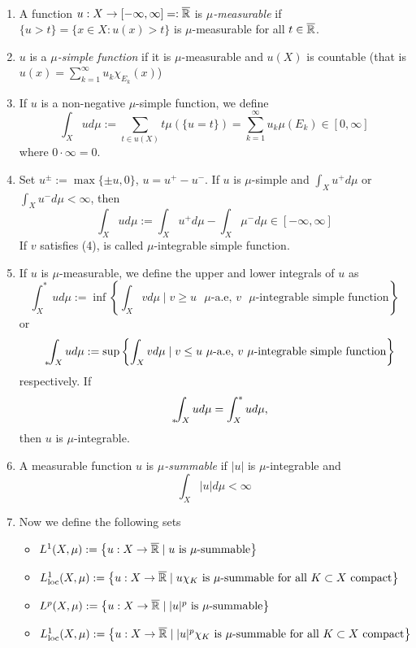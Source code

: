 \begin{definition}~
\begin{enumerate}[(1)]
\item A function $u : X \to [-\infty,\infty] =: \overline{\mathbb{R}}$ is \emph{$\mu$-measurable} if
$\{u > t\} = \{ x \in X : u(x) > t\}$ is $\mu$-measurable for all $t\in
\overline{\mathbb{R}}$.
\item $u$ is a \emph{$\mu$-simple function} if it is $\mu$-measurable and $u(X)$ is
countable (that is $u(x) = \sum_{k=1}^\infty u_k \chi_{E_k}(x)$)
\item If $u$ is a non-negative $\mu$-simple function, we define 
\[
\int_X u d\mu := \sum_{t \in u(X)} t\mu(\{u=t\}) = \sum_{k=1}^\infty u_k
\mu(E_k) \in [0,\infty]
\]
where $0 \cdot \infty = 0$.
\item Set $u^\pm := \max\{\pm u, 0 \}$, $u = u^+ - u^-$. 
If $u$ is $\mu$-simple and $\int_X u^+ d\mu$ or $\int_X u^- d\mu < \infty$, then
\[
\int_X u d\mu := \int_X u^+ d\mu - \int_X \mu^- d\mu \in [-\infty,\infty]
\]
If $v$ satisfies (4), is called $\mu$-integrable simple function.
\item If $u$ is $\mu$-measurable, we define the upper and lower integrals of $u$
as
\[
\int^*_X u d\mu := \inf \left\{ \int_X v d\mu \mid 
\text{$v \geq u$ $\mu$-a.e, $v$ $\mu$-integrable simple function}
\right\}
\]
or
\[
{\phantom{\int}}_{*}\hspace{-0.3em}\int_{X} u d\mu := \sup\left\{ \int_X v d\mu \mid 
\text{$v \leq u$ $\mu$-a.e, $v$ $\mu$-integrable simple function}
\right\}
\]
respectively. 
If
\[
{\phantom{\int}}_{*}\hspace{-0.3em}\int_{X} u d\mu = \int^*_X u d\mu,
\]
then $u$ is $\mu$-integrable.
\item A measurable function $u$ is \emph{$\mu$-summable} if $|u|$ is
$\mu$-integrable and 
\[
\int_X |u| d\mu < \infty
\]
\item Now we define the following sets 
\begin{itemize}[]
\item $L^1(X,\mu) := \left\{ u: X \to \overline{\mathbb{R}} \mid \text{$u$ is
$\mu$-summable} \right\}$
\item $L_{\textnormal{loc}}^1(X,\mu) := \left\{ u: X \to \overline{\mathbb{R}} \mid
\text{$u\chi_K$ is
$\mu$-summable for all $K\subset X$ compact} \right\}$
\item $L^p(X,\mu) := \left\{ u: X \to \overline{\mathbb{R}} \mid \text{$|u|^p$ is
$\mu$-summable} \right\}$
\item $L_{\textnormal{loc}}^1(X,\mu) := \left\{ u: X \to \overline{\mathbb{R}} \mid
\text{$|u|^p\chi_K$ is
$\mu$-summable for all $K\subset X$ compact} \right\}$
\end{itemize}
\end{enumerate}
\end{definition}

